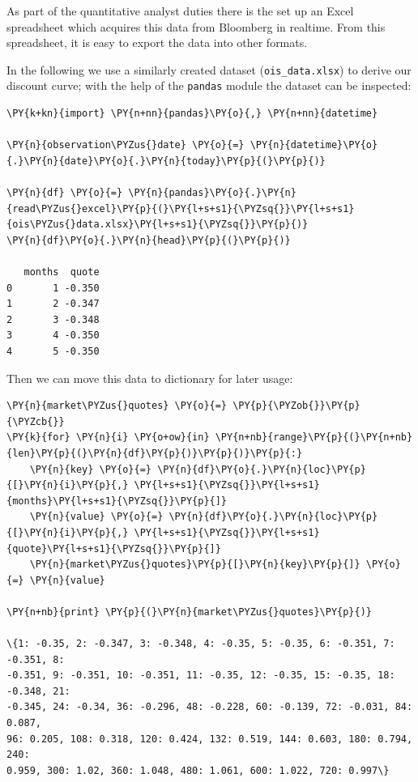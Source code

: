 As part of the quantitative analyst duties there is the set up an Excel spreadsheet which acquires this data from Bloomberg in realtime. From this spreadsheet, it is easy to export the data into other formats.

In the following we use a similarly created dataset (\texttt{ois\_data.xlsx}) to derive our discount curve; with the help of the \texttt{pandas} module the dataset can be inspected:

\begin{tcolorbox}[breakable, size=fbox, boxrule=1pt, pad at break*=1mm,colback=cellbackground, colframe=cellborder]
\begin{Verbatim}[commandchars=\\\{\}]
\PY{k+kn}{import} \PY{n+nn}{pandas}\PY{o}{,} \PY{n+nn}{datetime}

\PY{n}{observation\PYZus{}date} \PY{o}{=} \PY{n}{datetime}\PY{o}{.}\PY{n}{date}\PY{o}{.}\PY{n}{today}\PY{p}{(}\PY{p}{)}

\PY{n}{df} \PY{o}{=} \PY{n}{pandas}\PY{o}{.}\PY{n}{read\PYZus{}excel}\PY{p}{(}\PY{l+s+s1}{\PYZsq{}}\PY{l+s+s1}{ois\PYZus{}data.xlsx}\PY{l+s+s1}{\PYZsq{}}\PY{p}{)}
\PY{n}{df}\PY{o}{.}\PY{n}{head}\PY{p}{(}\PY{p}{)}

   months  quote
0       1 -0.350
1       2 -0.347
2       3 -0.348
3       4 -0.350
4       5 -0.350
\end{Verbatim}
\end{tcolorbox}

Then we can move this data to dictionary for later usage:
\begin{tcolorbox}[breakable, size=fbox, boxrule=1pt, pad at break*=1mm,colback=cellbackground, colframe=cellborder]
\begin{Verbatim}[commandchars=\\\{\}]
\PY{n}{market\PYZus{}quotes} \PY{o}{=} \PY{p}{\PYZob{}}\PY{p}{\PYZcb{}}
\PY{k}{for} \PY{n}{i} \PY{o+ow}{in} \PY{n+nb}{range}\PY{p}{(}\PY{n+nb}{len}\PY{p}{(}\PY{n}{df}\PY{p}{)}\PY{p}{)}\PY{p}{:}
    \PY{n}{key} \PY{o}{=} \PY{n}{df}\PY{o}{.}\PY{n}{loc}\PY{p}{[}\PY{n}{i}\PY{p}{,} \PY{l+s+s1}{\PYZsq{}}\PY{l+s+s1}{months}\PY{l+s+s1}{\PYZsq{}}\PY{p}{]}
    \PY{n}{value} \PY{o}{=} \PY{n}{df}\PY{o}{.}\PY{n}{loc}\PY{p}{[}\PY{n}{i}\PY{p}{,} \PY{l+s+s1}{\PYZsq{}}\PY{l+s+s1}{quote}\PY{l+s+s1}{\PYZsq{}}\PY{p}{]}
    \PY{n}{market\PYZus{}quotes}\PY{p}{[}\PY{n}{key}\PY{p}{]} \PY{o}{=} \PY{n}{value}
    
\PY{n+nb}{print} \PY{p}{(}\PY{n}{market\PYZus{}quotes}\PY{p}{)}

\{1: -0.35, 2: -0.347, 3: -0.348, 4: -0.35, 5: -0.35, 6: -0.351, 7: -0.351, 8:
-0.351, 9: -0.351, 10: -0.351, 11: -0.35, 12: -0.35, 15: -0.35, 18: -0.348, 21:
-0.345, 24: -0.34, 36: -0.296, 48: -0.228, 60: -0.139, 72: -0.031, 84: 0.087,
96: 0.205, 108: 0.318, 120: 0.424, 132: 0.519, 144: 0.603, 180: 0.794, 240:
0.959, 300: 1.02, 360: 1.048, 480: 1.061, 600: 1.022, 720: 0.997\}
\end{Verbatim}
\end{tcolorbox}

